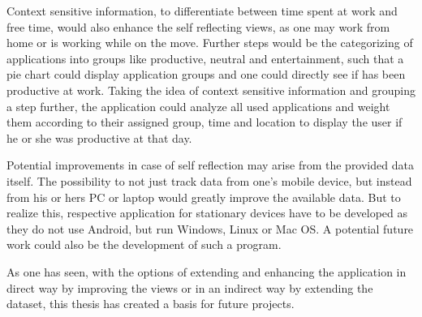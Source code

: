 Context  sensitive information, to differentiate between time spent at work and free time, would also enhance the self reflecting views, as one may work from home or is working while on the move. Further steps would be the categorizing of applications into groups like productive, neutral and entertainment, such that a pie chart could display application groups and one could directly see if has been productive at work. Taking the idea of context sensitive information and grouping a step further, the application could analyze all used applications and weight them according to their assigned group, time and location to display the user if he or she was productive at that day.

Potential  improvements in case of self reflection may arise from the provided data itself. The possibility to not just track data from one's mobile device, but instead from his or hers PC or laptop would greatly improve the available data. But to realize this, respective application for stationary devices have to be developed as they do not use Android, but run Windows, Linux or Mac OS. A potential future work could also be the development of such a program.

As one has seen, with the options of extending and enhancing the application in direct way by improving the views or in an indirect way by extending the dataset, this thesis has created a basis for future projects. 
